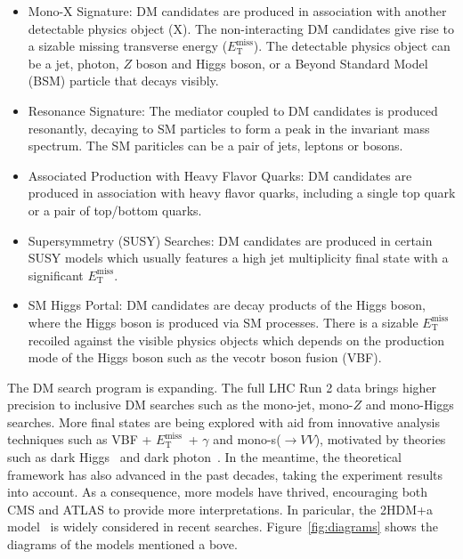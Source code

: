 \documentclass{moriond}
\def\et{E_\textrm{T}^{\textrm{miss}}}
\begin{document}
\begin{itemize}
\item Mono-X Signature: DM candidates are produced in association with another detectable physics object (X). The non-interacting DM candidates give rise to a sizable missing transverse energy ($\et$). The detectable physics object can be a jet, photon, $Z$ boson and Higgs boson, or a Beyond Standard Model (BSM) particle that decays visibly.   
\item Resonance Signature: The mediator coupled to DM candidates is produced resonantly, decaying to SM particles to form a peak in the invariant mass spectrum. The SM pariticles can be a pair of jets, leptons or bosons. 
\item Associated Production with Heavy Flavor Quarks: DM candidates are produced in association with heavy flavor quarks, including a single top quark or a pair of top/bottom quarks. 
\item Supersymmetry (SUSY) Searches: DM candidates are produced in certain SUSY models which usually features a high jet multiplicity final state with a significant $\et$.  
\item SM Higgs Portal: DM candidates are decay products of the Higgs boson, where the Higgs boson is produced via SM processes. There is a sizable $\et$ recoiled against the visible physics objects which depends on the production mode of the Higgs boson such as the vecotr boson fusion (VBF). 
\end{itemize}    

The DM search program is expanding. The full LHC Run 2 data brings higher
precision to inclusive DM searches such as the mono-jet, mono-$Z$ and
mono-Higgs searches. More final states are being explored with aid from
innovative analysis techniques such as VBF + $\et$\ +
$\gamma$ and mono-s($\rightarrow VV$), motivated by theories such as dark
Higgs~\cite{DarkH} and dark photon~\cite{DarkPh}. In the meantime, the
theoretical framework has also advanced in the past decades, taking the
experiment results into account.  As a consequence, more models have thrived,
encouraging both CMS and ATLAS to provide more interpretations. In paricular,
the 2HDM+a model~\cite{2HDM} is widely considered in recent searches.
Figure~\ref{fig:diagrams} shows the diagrams of the models mentioned a bove.
\end{document}
